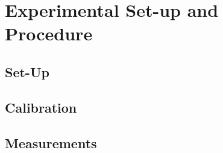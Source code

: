 \section{Experimental Set-up and Procedure}
\subsection{Set-Up}

\subsection{Calibration}

\subsection{Measurements}
